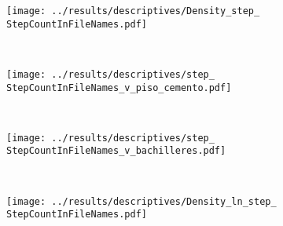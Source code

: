 \documentclass[12pt]{article}
\newcommand{\StepCountInFileNames}{6}
\begin{document}
	\begin{figure}[h!] \RawFloats
	\centering
	\caption{ \\[-1.75em]}\label{fig:descriptives}
	\caption*{\small{\emph{These figures describe the relationships between communication centrality and (a) neighborhood (census-tract) poverty, (b) neighborhood (census-tract) education, (c) protest participation, and (d) petition-signing, all using a representative sample of the population of six large Venezuelan states.}} \\[-1.5em]}
	\begin{subfigure}[t]{0.29\textwidth}
	\caption{\footnotesize{}}\label{fig:descriptivesA}
	\texttt{[image: ../results/descriptives/Density\_step\_\\StepCountInFileNames.pdf]} \\[-1.1em]
	\end{subfigure} %
        ~  \hspace{0cm}
	\begin{subfigure}[t]{0.29\textwidth}
	\caption{\footnotesize{} }\label{fig:descriptivesB}
	\texttt{[image: ../results/descriptives/step\_\\StepCountInFileNames\_v\_piso\_cemento.pdf]} \\[-1.1em]
         \end{subfigure}
        ~  \hspace{0cm}
	\begin{subfigure}[t]{0.29\textwidth}
	\caption{\footnotesize{} }\label{fig:descriptivesC}
	\texttt{[image: ../results/descriptives/step\_\\StepCountInFileNames\_v\_bachilleres.pdf]} \\[-1.1em]
         \end{subfigure} \\[0.8em]
	\begin{subfigure}[t]{0.29\textwidth}
	\caption{\footnotesize{}}\label{fig:descriptivesD}
	\texttt{[image: ../results/descriptives/Density\_ln\_step\_\\StepCountInFileNames.pdf]} \\[-1.1em]

\end{subfigure}
\end{figure}
\end{document}
